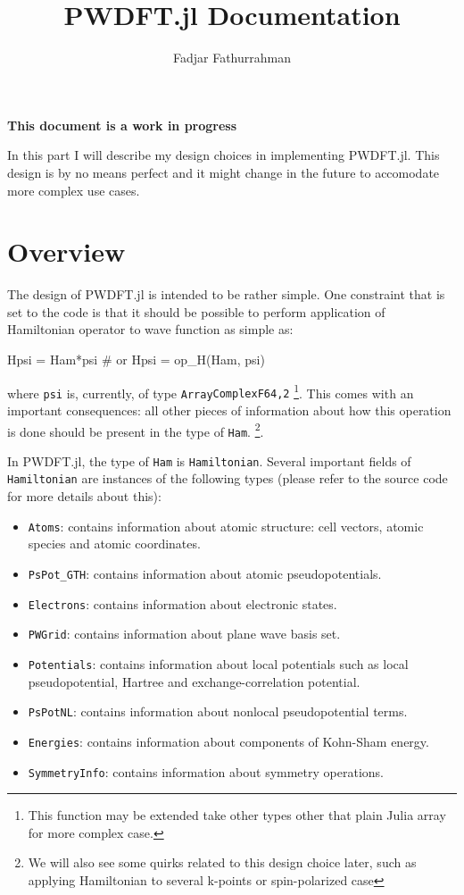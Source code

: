 \documentclass[a4paper,10pt,fleqn]{article}
\newcommand{\jlinline}[1]{\texttt{#1}}
\begin{document}
\title{\textsf{PWDFT.jl} Documentation}
\author{Fadjar Fathurrahman}
\date{}
\maketitle


\textbf{This document is a work in progress}

In this part I will describe my design choices in implementing \textsf{PWDFT.jl}.
This design is by no means perfect
and it might change in the future to accomodate more complex use cases.

\section{Overview}

The design of \textsf{PWDFT.jl} is intended to be rather simple. One constraint
that is set to the code is that it should be possible to perform application
of Hamiltonian operator to wave function as simple as:
%
\begin{juliacode}
Hpsi = Ham*psi # or
Hpsi = op_H(Ham, psi)
\end{juliacode}
%
where \jlinline{psi} is, currently, of type \jlinline{Array{ComplexF64,2}}
\footnote{This function may be extended take other types other that plain Julia
array for more complex case.}.
%
This comes with an important consequences: all other pieces of information
about how this operation is done should be present in the type of \jlinline{Ham}.
\footnote{We will also see some quirks related to this design choice later,
such as applying Hamiltonian to several k-points or spin-polarized case}.

In \textsf{PWDFT.jl}, the type of \jlinline{Ham} is \jlinline{Hamiltonian}.
Several important fields of \jlinline{Hamiltonian} are instances of the following
types (please refer to the source code for more details about this):
\begin{itemize}
\item \jlinline{Atoms}: contains information about atomic structure: cell
vectors, atomic species and atomic coordinates.
\item \jlinline{PsPot_GTH}: contains information about atomic pseudopotentials.
\item \jlinline{Electrons}: contains information about electronic states.
\item \jlinline{PWGrid}: contains information about plane wave basis set.
\item \jlinline{Potentials}: contains information about local potentials such
as local pseudopotential, Hartree and exchange-correlation potential.
\item \jlinline{PsPotNL}: contains information about nonlocal pseudopotential
terms.
\item \jlinline{Energies}: contains information about components of Kohn-Sham
energy.
\item \jlinline{SymmetryInfo}: contains information about symmetry operations.
\end{itemize}
\end{document}
